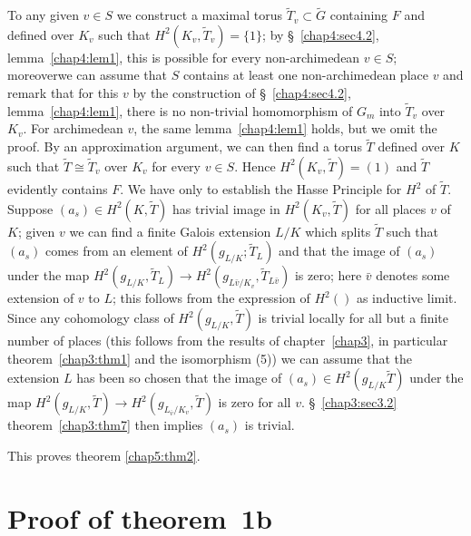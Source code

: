 \begin{step}%
To any given $v \in S$ we construct a maximal
 torus $\tilde{T}_v \subset \tilde{G}$ containing $F$ and defined over
 $K_v$ such that $H^2(K_v,\tilde{T}_v) = \{1\}$; by \S~\ref{chap4:sec4.2}, 
lemma~\ref{chap4:lem1}, this is possible for every non-archimedean $v \in S$; 
 moreover\pageoriginale we 
 can assume that $S$ contains at least one non-archimedean place $v$
 and remark that for this $v$ by the construction of \S~\ref{chap4:sec4.2}, 
lemma~\ref{chap4:lem1}, there is no non-trivial homomorphism of $G_m$ into
$\tilde{T}_v$ 
 over $K_v$. For archimedean $v$, the same lemma~\ref{chap4:lem1} holds, but we
 omit the proof. By an approximation argument, we can then find a
 torus $\tilde{T}$ defined over $K$ such that $\tilde{T} \cong
 \tilde{T}_v$ over $K_v$ for every $v \in S$. Hence $H^2(K_v,
 \tilde{T}) =(1)$ and $\tilde{T}$ evidently contains $F$. We have only
 to establish the Hasse Principle for $H^2$ of $\tilde{T}$. Suppose
 $(a_s)\in H^2(K, \tilde{T})$ has trivial image in $H^2(K_{v},
 \tilde{T})$ for all places $v$ of $K$; given $v$ we can find a finite
 Galois extension $L/K$ which splits $\tilde{T}$ such that $(a_{s})$
 comes from an element of $H^2(g_{L/K}; \tilde{T}_L)$ and that the
 image of $(a_s)$ under the map $H^2(g_{L/K}, \tilde{T}_L) \to
H^2 (g_{L\bar{v}/K_v}, \tilde{T}_{L\bar{v}})$ is zero; here $\bar{v}$
 denotes some extension of $v$ to $L$; this follows from the
 expression of $H^2()$ as inductive limit. Since any cohomology class
 of $H^2(g_{L/K}, \tilde{T})$ is trivial locally for all but a finite
 number of places (this follows from the results of chapter~\ref{chap3}, in
 particular theorem~\ref{chap3:thm1} and the isomorphism (5))  we can
 assume that 
 the extension $L$ has been so chosen that the image of $(a_s)\in
 H^2(g_{L/K} \tilde{T})$ under the map $H^2(g_{L/K}, \tilde{T})
 \rightarrow H^2(g_{L_{\bar{v}}/K_v}, \tilde{T})$ is zero for all
$v$. \S~\ref{chap3:sec3.2} theorem~\ref{chap3:thm7} then implies
 $(a_s)$ is trivial.  
\end{step}

 This proves theorem \ref{chap5:thm2}.
 

 \section{Proof of theorem~1b}\label{chap5:sec5.3}
 
